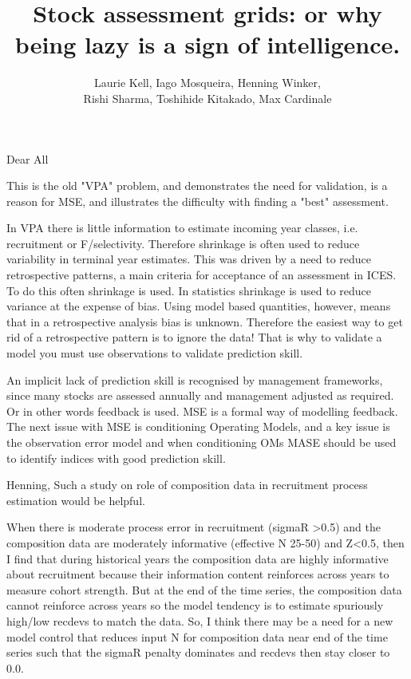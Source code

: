 \documentclass[a4paper]{article}
\title{Stock assessment grids: or why being lazy is a sign of intelligence.}
\author{Laurie Kell, Iago Mosqueira, Henning Winker, \\Rishi Sharma, Toshihide  Kitakado, Max Cardinale}
\begin{document}
\maketitle

Dear All

This is the old "VPA" problem, and demonstrates the need for validation, is a reason for MSE, and illustrates the difficulty with finding a "best" assessment.

In VPA there is little information to estimate incoming year classes, i.e. recruitment or F/selectivity. Therefore shrinkage is often used to reduce variability in terminal year estimates. This was driven by a need to reduce retrospective patterns, a main criteria for acceptance of an assessment in ICES. To do this often shrinkage is used.  In statistics shrinkage is used to reduce variance at the expense of bias. Using model based quantities, however, means that in a retrospective analysis bias is unknown.  Therefore the easiest way to get rid of a retrospective pattern is to ignore the data! That is why to validate a model you must use observations to validate prediction skill.

An implicit lack of prediction skill is recognised by management frameworks, since many stocks are assessed annually and management adjusted as required. Or in other words feedback is used. MSE is a formal way of modelling feedback. The next issue with MSE is conditioning Operating Models, and a key issue is the observation error model and when conditioning OMs MASE should be used to identify indices with good prediction skill.



Henning,
Such a study on role of composition data in recruitment process estimation would be helpful.

When there is moderate process error in recruitment (sigmaR >0.5) and the composition data are moderately informative (effective N 25-50) and Z<0.5, then I find that during historical years the composition data are highly informative about recruitment because their information content reinforces across years to measure cohort strength.  But at the end of the time series, the composition data cannot reinforce across years so the model tendency is to estimate spuriously high/low recdevs to match the data. So, I think there may be a need for a new model control that reduces input N for composition data near end of the time series such that the sigmaR penalty dominates and recdevs then stay closer to 0.0.
\end{document}
